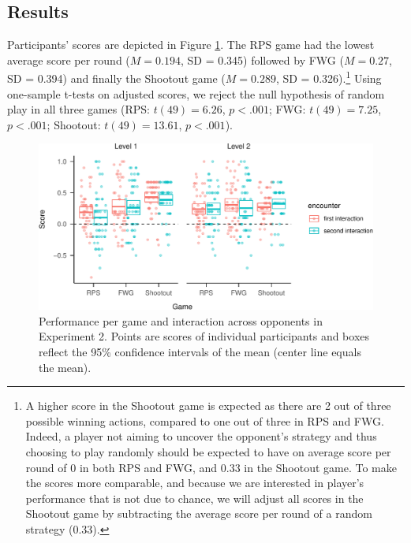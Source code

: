 \documentclass[
  english,
  man,floatsintext]{apa6}
\begin{document}
\hypertarget{results-1}{%
\subsection{Results}\label{results-1}}

Participants' scores are depicted in Figure \ref{fig:exp2-score-by-opp}. The RPS game had the lowest average score per round (\(M = 0.194\), SD = 0.345) followed by FWG (\(M = 0.27\), SD = 0.394) and finally the Shootout game (\(M = 0.289\), SD = 0.326).\footnote{A higher score in the Shootout game is expected as there are 2 out of three possible winning actions, compared to one out of three in RPS and FWG. Indeed, a player not aiming to uncover the opponent's strategy and thus choosing to play randomly should be expected to have on average score per round of 0 in both RPS and FWG, and 0.33 in the Shootout game. To make the scores more comparable, and because we are interested in player's performance that is not due to chance, we will adjust all scores in the Shootout game by subtracting the average score per round of a random strategy (0.33).} Using one-sample t-tests on adjusted scores, we reject the null hypothesis of random play in all three games (RPS: \(t(49) = 6.26\), \(p < .001\); FWG: \(t(49) = 7.25\), \(p < .001\); Shootout: \(t(49) = 13.61\), \(p < .001\)).

\begin{figure}

{\centering \includegraphics{paper_draft_2021_files/figure-latex/exp2-score-by-opp-1} 

}

\caption{\label{fig:exp2-score-by-opp}Performance per game and interaction across opponents in Experiment 2. Points are scores of individual participants and boxes reflect the 95\% confidence intervals of the mean (center line equals the mean).}\label{fig:exp2-score-by-opp}
\end{figure}
\end{document}
